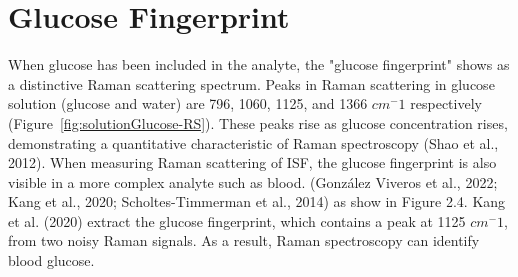 \section{Glucose Fingerprint}
When glucose has been included in the analyte, the "glucose fingerprint" shows as a distinctive Raman scattering spectrum. 
Peaks in Raman scattering in glucose solution (glucose and water) are 796, 1060, 1125, and 1366 $cm^-1$ respectively (Figure~\ref{fig:solutionGlucose-RS}). These peaks rise as glucose concentration rises, demonstrating a quantitative characteristic of Raman spectroscopy (Shao et al., 2012).
When measuring Raman scattering of ISF, the glucose fingerprint is also visible in a more complex analyte such as blood. (González Viveros et al., 2022; Kang et al., 2020; Scholtes-Timmerman et al., 2014) as show in Figure 2.4. Kang et al. (2020) extract the glucose fingerprint, which contains a peak at 1125 $cm^-1$, from two noisy Raman signals. As a result, Raman spectroscopy can identify blood glucose.

